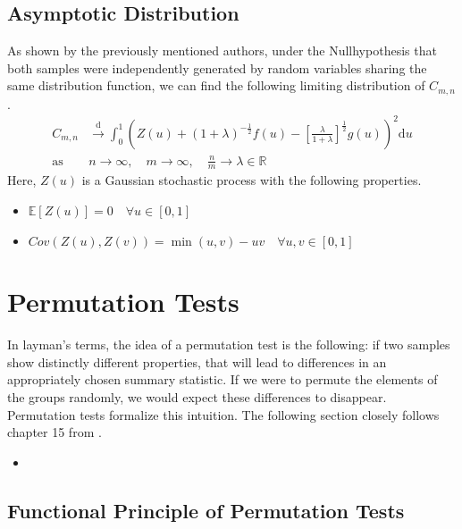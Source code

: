 \documentclass[12pt, a4paper]{article}
\theoremstyle{MAstyle} \newtheorem{assumption}{Assumption}[section]
\theoremstyle{MAstyle} \newtheorem{definition}{Definition}[section]
\begin{document}
		\subsection{Asymptotic Distribution}
			As shown by the previously mentioned authors, under the Nullhypothesis that both samples were independently generated by random variables sharing the same distribution function, we can find the following limiting distribution of $C_{m,n}$.
			\begin{equation}
				\begin{split}
					C_{m,n} &\xrightarrow{\text{d}} \int_{0}^{1} \left(Z(u) + \left(1 + \lambda\right)^{-\frac{1}{2}} f(u) - \left[\frac{\lambda}{1+\lambda}\right]^{\frac{1}{2}}g(u)\right)^2 \mathrm{d}u \\
					\text{as} \quad &n \rightarrow \infty, \quad m \rightarrow \infty, \quad \frac{n}{m} \rightarrow \lambda \in \mathbb{R}
				\end{split}
			\end{equation}
			Here, $Z(u)$ is a Gaussian stochastic process with the following properties.
			\begin{itemize}
				\item $\mathbb{E}\left[Z(u)\right] = 0 \quad \forall u \in [0,1]$
				\item $Cov\left(Z(u), Z(v)\right) = \min(u,v) - uv \quad \forall u,v \in [0,1]$
			\end{itemize}					
			
	\section{Permutation Tests}\label{Permutation_Tests}
		In layman's terms, the idea of a permutation test is the following: if two samples show distinctly different properties, that will lead to differences in an appropriately chosen summary statistic. If we were to permute the elements of the groups randomly, we would expect these differences to disappear.
		Permutation tests formalize this intuition. The following section closely follows chapter 15 from \cite{lehmann_testing_2005}.
		
		\begin{itemize}
			\item \cite{van_der_vaart_weak_1996}
		\end{itemize}
	
		\subsection{Functional Principle of Permutation Tests}
		
\end{document}
